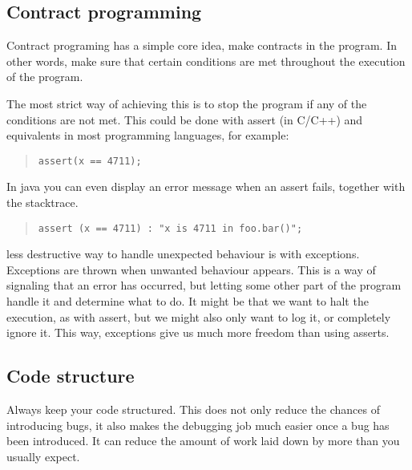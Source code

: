 \documentclass[11pt,a4paper,twoside]{article}
\begin{document}
\subsection{Contract programming}

Contract programing has a simple core idea, make contracts in the program. In
other words, make sure that certain conditions are met throughout the execution
of the program.

The most strict way of achieving this is to stop the program if any of the
conditions are not met. This could be done with assert (in C/C++) and
equivalents in most programming languages, for example:

\begin{quote}
\begin{verbatim}
assert(x == 4711);
\end{verbatim}
\end{quote}

In java you can even display an error message when an assert fails, together
with the stacktrace.

\begin{quote}
\begin{verbatim}
assert (x == 4711) : "x is 4711 in foo.bar()";
\end{verbatim}
\end{quote}

 less destructive way to handle unexpected behaviour is with
exceptions.  Exceptions are thrown when unwanted behaviour appears. This is a
way of signaling that an error has occurred, but letting some other part of the
program handle it and determine what to do. It might be that we want to halt
the execution, as with assert, but we might also only want to log it, or
completely ignore it. This way, exceptions give us much more freedom than using
asserts.

\subsection{Code structure}
Always keep your code structured. This does not only reduce the chances of
introducing bugs, it also makes the debugging job much easier once a bug has
been introduced. It can reduce the amount of work laid down by more than you
usually expect.

\end{document}
